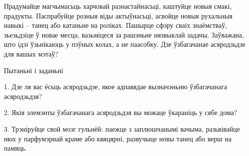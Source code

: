Прадумайце магчымасьць харчовай разнастайнасьці, каштуйце новыя смакі, прадукты. Паспрабуйце розныя віды актыўнасьці, асвойце новыя рухальныя навыкі – танец або катаньне на роліках. Пашырце сфэру сваіх знаёмстваў, зьезьдзіце ў новае месца, вазьміцеся за рашэньне нязвыклай задачы. Заўважана, што ідэі ўзьнікаюць у пэўных колах, а не паасобку. Дзе ўзбагачанае асяродзьдзе для вашых мэтаў?

Пытаньні і заданьні

1. Дзе ля вас ёсьць асяродзьдзе, якое адпавядае вызначэньню ўзбагачанага асяродзьдзя?

2. Якія элемэнты ўзбагачанага асяродзьдзя вы можаце ўкараніць у сябе дома?

3. Трэніруйце свой мозг гульнёй: паежце з заплюшчанымі вачыма, разьвівайце нюх у парфумэрнай краме або квяцярні, развучыце новы танец або верш на памяць.

